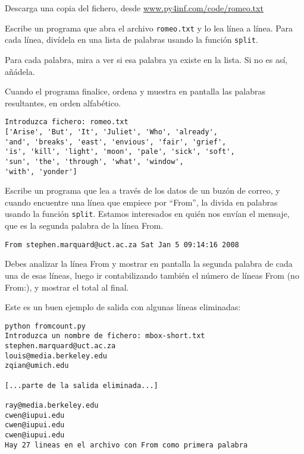 \begin{ex}
Descarga una copia del fichero, desde
\url{www.py4inf.com/code/romeo.txt}

Escribe un programa que abra el archivo {\tt romeo.txt} y lo lea
línea a línea. Para cada línea, divídela en una lista de
palabras usando la función {\tt split}.

Para cada palabra, mira a ver si esa palabra ya existe en la lista.
Si no es así, añádela.

Cuando el programa finalice, ordena y muestra en pantalla las
palabras resultantes, en orden alfabético.

\begin{verbatim}
Introduzca fichero: romeo.txt
['Arise', 'But', 'It', 'Juliet', 'Who', 'already', 
'and', 'breaks', 'east', 'envious', 'fair', 'grief', 
'is', 'kill', 'light', 'moon', 'pale', 'sick', 'soft', 
'sun', 'the', 'through', 'what', 'window', 
'with', 'yonder']
\end{verbatim}
\end{ex}

\begin{ex}
Escribe un programa que lea a través de los datos de un buzón de correo, y cuando
encuentre una línea que empiece por ``From'', la divida en
palabras usando la función {\tt split}. Estamos interesados en
quién nos envían el mensaje, que es la segunda palabra de la línea From.

{\tt From stephen.marquard@uct.ac.za Sat Jan  5 09:14:16 2008 }

Debes analizar la línea From y mostrar en pantalla la segunda palabra de
cada una de esas líneas, luego ir contabilizando también el número de líneas From
(no From:), y mostrar el total al final.

Este es un buen ejemplo de salida con algunas líneas eliminadas:

\beforeverb
\begin{verbatim}
python fromcount.py 
Introduzca un nombre de fichero: mbox-short.txt
stephen.marquard@uct.ac.za
louis@media.berkeley.edu
zqian@umich.edu

[...parte de la salida eliminada...]

ray@media.berkeley.edu
cwen@iupui.edu
cwen@iupui.edu
cwen@iupui.edu
Hay 27 lineas en el archivo con From como primera palabra
\end{verbatim}
\afterverb
%
\end{ex}

